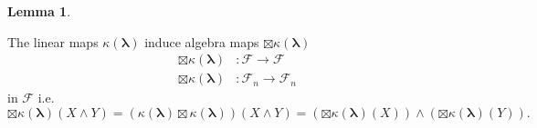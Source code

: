\documentclass[aps, preprint]{revtex4}
\newtheorem{lemma}[theorem]{Lemma}
\begin{document}
\begin{lemma}
\end{lemma}

The linear maps $\kappa  \left (\mathbf{\lambda }\right )$ induce algebra maps $ \boxtimes \kappa  \left (\mathbf{\lambda }\right )$
\begin{align} \boxtimes \kappa  \left (\mathbf{\lambda }\right ) &  :\mathcal{F} \rightarrow \mathcal{F} \\
 \boxtimes \kappa  \left (\mathbf{\lambda }\right ) &  :\mathcal{F}_{n} \rightarrow \mathcal{F}_{n}\end{align}in $\mathcal{F}$ i.e.
\begin{equation} \boxtimes \kappa  \left (\mathbf{\lambda }\right ) \left (X \wedge Y\right ) =\left (\kappa  \left (\mathbf{\lambda }\right ) \boxtimes \kappa  \left (\mathbf{\lambda }\right )\right ) \left (X \wedge Y\right ) =\left ( \boxtimes \kappa  \left (\mathbf{\lambda }\right ) \left (X\right )\right ) \wedge \left ( \boxtimes \kappa  \left (\mathbf{\lambda }\right ) \left (Y\right )\right )\text{.}
\end{equation}
\end{document}
